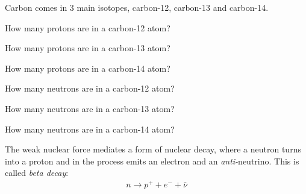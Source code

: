 \documentclass[12pt]{exam}
\begin{document}
\begin{questions}

	\clearpage
	\question Carbon comes in 3 main isotopes, carbon-12, carbon-13 and carbon-14.
		\begin{parts}
			\item How many protons are in a carbon-12 atom?
				\vspace{0.3in}
			\item How many protons are in a carbon-13 atom?
				\vspace{0.3in}
			\item How many protons are in a carbon-14 atom?
				\vspace{0.3in}
			\item How many neutrons are in a carbon-12 atom?
				\vspace{0.3in}
			\item How many neutrons are in a carbon-13 atom?
				\vspace{0.3in}
			\item How many neutrons are in a carbon-14 atom?
				\vspace{0.3in}
		\end{parts}
	
	\question The weak nuclear force mediates a form of nuclear decay, where a neutron turns into a proton and in the process emits an electron and an \textit{anti-}neutrino. This is called \textit{beta decay}:
	\begin{eqnarray}
	n \rightarrow p^+ + e^- + \bar{\nu} \nonumber
	\end{eqnarray}
	\begin{parts}

\end{parts}
\end{questions}
\end{document}
